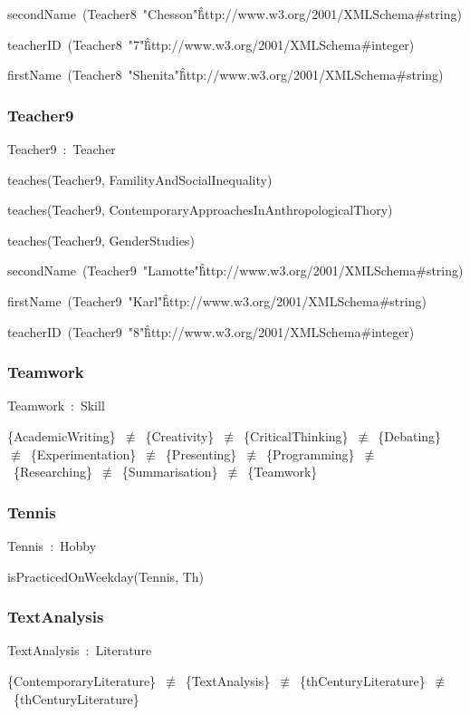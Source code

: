 \documentclass{article}
\begin{document}
secondName~(Teacher8~"Chesson"\^\^http://www.w3.org/2001/XMLSchema#string)

teacherID~(Teacher8~"7"\^\^http://www.w3.org/2001/XMLSchema#integer)

firstName~(Teacher8~"Shenita"\^\^http://www.w3.org/2001/XMLSchema#string)

\subsubsection*{Teacher9}

Teacher9~:~Teacher

teaches(Teacher9, FamilityAndSocialInequality)

teaches(Teacher9, ContemporaryApproachesInAnthropologicalThory)

teaches(Teacher9, GenderStudies)

secondName~(Teacher9~"Lamotte"\^\^http://www.w3.org/2001/XMLSchema#string)

firstName~(Teacher9~"Karl"\^\^http://www.w3.org/2001/XMLSchema#string)

teacherID~(Teacher9~"8"\^\^http://www.w3.org/2001/XMLSchema#integer)

\subsubsection*{Teamwork}

Teamwork~:~Skill

\{AcademicWriting\}~\ensuremath{\not\equiv}~\{Creativity\}~\ensuremath{\not\equiv}~\{CriticalThinking\}~\ensuremath{\not\equiv}~\{Debating\}~\ensuremath{\not\equiv}~\{Experimentation\}~\ensuremath{\not\equiv}~\{Presenting\}~\ensuremath{\not\equiv}~\{Programming\}~\ensuremath{\not\equiv}~\{Researching\}~\ensuremath{\not\equiv}~\{Summarisation\}~\ensuremath{\not\equiv}~\{Teamwork\}

\subsubsection*{Tennis}

Tennis~:~Hobby

isPracticedOnWeekday(Tennis, Th)

\subsubsection*{TextAnalysis}

TextAnalysis~:~Literature

\{ContemporaryLiterature\}~\ensuremath{\not\equiv}~\{TextAnalysis\}~\ensuremath{\not\equiv}~\{thCenturyLiterature\}~\ensuremath{\not\equiv}~\{thCenturyLiterature\}
\end{document}
